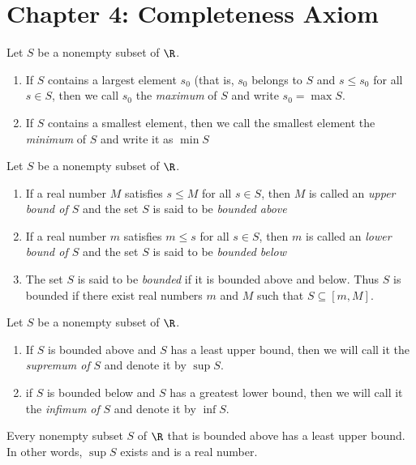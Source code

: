 \documentclass[10pt]{article}
\begin{document}
\section*{Chapter 4: Completeness Axiom}
\begin{defn}
Let $S$ be a nonempty subset of $\R$.
\begin{enumerate}
    \item If $S$ contains a largest element $s_0$ (that is, $s_0$ belongs to $S$ and $s\le s_0$ for all $s\in S$, then we call $s_0$ the \emph{maximum} of $S$ and write $s_0=\max S$.
    \item If $S$ contains a smallest element, then we call the smallest element the \emph{minimum} of $S$ and write it as $\min S$
\end{enumerate}
\end{defn}

\begin{defn}[Bounds]
Let $S$ be a nonempty subset of $\R$.
\begin{enumerate}
    \item If a real number $M$ satisfies $s\le M$ for all $s\in S$, then $M$ is called an \emph{upper bound of $S$} and the set $S$ is said to be \emph{bounded above}
    \item If a real number $m$ satisfies $m\le s$ for all $s\in S$, then $m$ is called an \emph{lower bound of $S$} and the set $S$ is said to be \emph{bounded below}
    \item The set $S$ is said to be \emph{bounded} if it is bounded above and below. Thus $S$ is bounded if there exist real numbers $m$ and $M$ such that $S\subseteq [m, M]$.
\end{enumerate}
\end{defn}

\begin{defn}
Let $S$ be a nonempty subset of $\R$.
\begin{enumerate}
    \item If $S$ is bounded above and $S$ has a least upper bound, then we will call it the \emph{supremum of} $S$ and denote it by $\sup S$.
    \item if $S$ is bounded below and $S$ has a greatest lower bound, then we will call it the \emph{infimum of} $S$ and denote it by $\inf S$.
\end{enumerate}
\end{defn}

\begin{thm} 
Every nonempty subset $S$ of $\R$ that is bounded above has a least upper bound. In other words, $\sup S$ exists and is a real number.
\end{thm}
\end{document}
